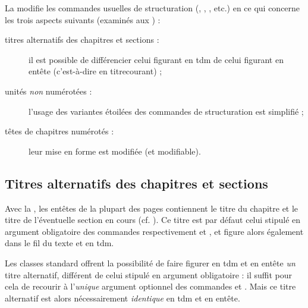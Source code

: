 La \yatCl{} modifie les commandes usuelles de structuration
(, , ,
etc.)  en ce qui concerne les trois aspects suivants (examinés aux
) :
\begin{description}
\item[titres alternatifs des chapitres et sections :] il est possible de
  différencier celui figurant en \gls{tdm} de celui figurant en
  entête (c'est-à-dire en \gls{titrecourant}) ;
\item[unités \emph{non} numérotées :] l'usage des variantes étoilées des
  commandes de structuration est simplifié ;
\item[têtes de chapitres numérotés :] leur mise en forme est modifiée (et
  modifiable).
\end{description}

\subsection{Titres alternatifs des chapitres et sections}
\label{sec-intit-altern}
%
%

%

Avec la \yatCl{}, les entêtes de la plupart des pages contiennent le titre du
chapitre et le titre de l'éventuelle section en cours
(cf. ).
%
Ce titre est par défaut celui stipulé en argument obligatoire des commandes
respectivement  et , et figure
alors également dans le fil du texte et en \gls{tdm}\signet{}.

%
Les classes standard offrent la possibilité de faire figurer en
\gls{tdm}\signet{} et en entête \emph{un} titre alternatif, différent de celui
stipulé en argument obligatoire : il suffit pour cela de recourir
à l'\emph{unique} argument optionnel des commandes  et
. Mais ce titre alternatif est alors nécessairement
\emph{identique} en \gls{tdm}\signet{} et en entête.

